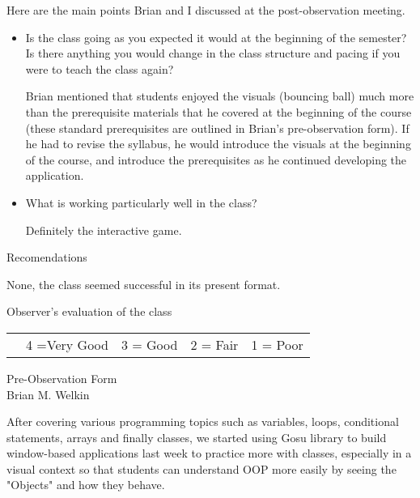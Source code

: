 \documentclass[11pt,dvipsnames]{article}
\begin{document}
Here are the main points Brian and I discussed at the post-observation meeting.

\begin{itemize}
\item Is the class going as you expected it would at the beginning of the semester? Is there anything you would change in the class structure and pacing if you were to teach the class again?

\begin{adjustwidth}{1cm}{1cm}
Brian mentioned that students enjoyed the visuals (bouncing ball) much more than the prerequisite materials that he covered at the beginning of the course (these standard prerequisites are outlined in Brian's pre-observation form). If he had to revise the syllabus, he would introduce the visuals at the beginning of the course, and introduce the prerequisites as he continued developing the application.
\end{adjustwidth}
\item What is working particularly well in the class?
\begin{adjustwidth}{1cm}{1cm}
Definitely the interactive game. 
\end{adjustwidth}
\end{itemize}

\vskip 1cm
{\large Recomendations}

None, the class seemed successful in its present format.

\vskip 1cm
{\large Observer's evaluation of the class}


{\tabulinesep=1.2mm
	\begin{tabu}{c  c c c c  }
		
		{}   & 4 =Very Good & 3 = Good & 2 = Fair & 1 = Poor   \\ 	
	\end{tabu}}

\newpage

\begin{center}
		{{\Large {Pre-Observation Form}}\\
\large Brian M. Welkin}
	\end{center}
	
After covering various programming topics such as variables, loops, conditional statements, arrays and finally classes, we started using Gosu library to build window-based applications last week to practice more with classes, especially in a visual context so that students can understand OOP more easily by seeing the "Objects" and how they behave. 
\end{document}
